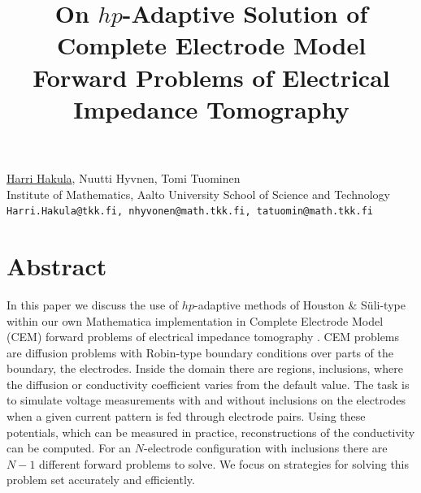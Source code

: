 \title{On $hp$-Adaptive Solution of Complete Electrode Model Forward Problems of Electrical Impedance Tomography}
\author{} \institute{}
\maketitle

\begin{center}
{\large \underline{Harri Hakula}, Nuutti Hyvnen, Tomi Tuominen}\\
Institute of Mathematics, Aalto University School of Science and Technology\\
{\tt Harri.Hakula@tkk.fi, nhyvonen@math.tkk.fi, tatuomin@math.tkk.fi}
\end{center}

\section*{Abstract}
In this paper we discuss the use of $hp$-adaptive methods of Houston \& S\"uli-type \cite{HT} within our own Mathematica implementation in Complete Electrode Model
(CEM) forward problems  of electrical impedance tomography \cite{LHH}. CEM problems are diffusion problems with Robin-type boundary conditions over parts of the boundary, the electrodes. Inside the domain there are regions, inclusions, where the diffusion or conductivity coefficient varies from the default value. The task is to simulate voltage measurements with and without inclusions on the electrodes when a given current pattern is fed through electrode pairs. Using these potentials, which can be measured in practice, reconstructions of the conductivity can be computed. For an $N$-electrode configuration with inclusions there are $N-1$ different forward problems to solve. We focus on strategies for solving this problem set accurately and efficiently.

